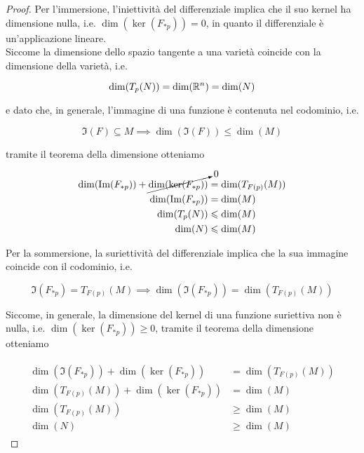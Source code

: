 \begin{proof}
	Per l'immersione, l'iniettività del differenziale implica che il suo kernel ha dimensione nulla, i.e. $ \dim(\ker(F_{*p})) = 0 $, in quanto il differenziale è un'applicazione lineare.\\
	Siccome la dimensione dello spazio tangente a una varietà coincide con la dimensione della varietà, i.e.
	
	\begin{equation}
		\dim(T_{p}(N)) = \dim(\mathbb{R}^{n}) = \dim(N)
	\end{equation}

	e dato che, in generale, l'immagine di una funzione è contenuta nel codominio, i.e.
	
	\begin{equation}
		\Im(F) \subseteq M %
		\implies %
		\dim(\Im(F)) \leqslant \dim(M)
	\end{equation}
	
	tramite il teorema della dimensione otteniamo
	
	\begin{align}
		\begin{split}
			\dim(\Im(F_{*p})) + \cancelto{0}{ \dim(\ker(F_{*p})) } &= \dim(T_{F(p)}(M))\\
			\dim(\Im(F_{*p})) &= \dim(M)\\
			\dim(T_{p}(N)) &\leqslant \dim(M)\\
			\dim(N) &\leqslant \dim(M)
		\end{split}
	\end{align}

	Per la sommersione, la suriettività del differenziale implica che la sua immagine coincide con il codominio, i.e.
	
	\begin{equation}
		\Im(F_{*p}) = T_{F(p)}(M) %
		\implies %
		\dim(\Im(F_{*p})) = \dim(T_{F(p)}(M))
	\end{equation}

	Siccome, in generale, la dimensione del kernel di una funzione suriettiva non è nulla, i.e. $ \dim(\ker(F_{*p})) \geqslant 0 $, tramite il teorema della dimensione otteniamo
	
	\begin{align}
		\begin{split}
			\dim(\Im(F_{*p})) + \dim(\ker(F_{*p})) &= \dim(T_{F(p)}(M))\\
			\dim(T_{F(p)}(M)) + \dim(\ker(F_{*p})) &= \dim(M)\\
			\dim(T_{F(p)}(M)) &\geqslant \dim(M)\\
			\dim(N) &\geqslant \dim(M)
		\end{split}
	\end{align}
\end{proof}

